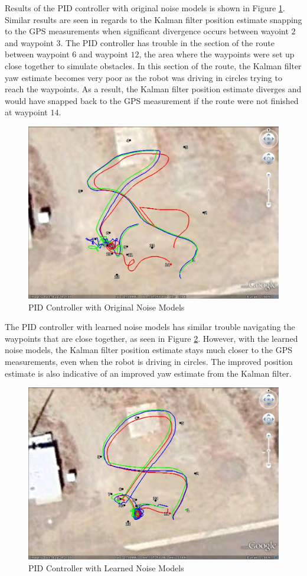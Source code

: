 Results of the PID controller with original noise models is shown in Figure \ref{fig:kfResults3}. Similar results are seen in regards to the Kalman filter position estimate snapping to the GPS measurements when significant divergence occurs between wayoint $2$ and waypoint $3$. The PID controller has trouble in the section of the route between waypoint $6$ and waypoint $12$, the area where the waypoints were set up close together to simulate obstacles. In this section of the route, the Kalman filter yaw estimate becomes very poor as the robot was driving in circles trying to reach the waypoints. As a result, the Kalman filter position estimate diverges and would have snapped back to the GPS measurement if the route were not finished at waypoint $14$.

\begin{figure}[ht!]
	\centering
	\includegraphics[width=.75\textwidth]{images/GE/20101203_1755_kf_pidOrigQR}
	\caption{PID Controller with Original Noise Models}
	\label{fig:kfResults3}
\end{figure}

The PID controller with learned noise models has similar trouble navigating the waypoints that are close together, as seen in Figure \ref{fig:kfResults4}. However, with the learned noise models, the Kalman filter position estimate stays much closer to the GPS measurements, even when the robot is driving in circles. The improved position estimate is also indicative of an improved yaw estimate from the Kalman filter.

\begin{figure}[ht!]
	\centering
	\includegraphics[width=.75\textwidth]{images/GE/20101203_1751_kf_pidNewQR}
	\caption{PID Controller with Learned Noise Models}
	\label{fig:kfResults4}
\end{figure}

